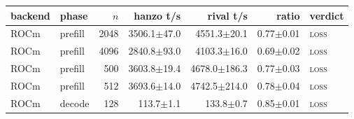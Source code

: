 \begin{tabular}{@{}llrrrrl@{}}
\toprule
backend & phase & $n$ & hanzo t/s & rival t/s & ratio & verdict \\
\midrule
ROCm & prefill & 2048 & 3506.1$\pm$47.0 & 4551.3$\pm$20.1 & 0.77$\pm$0.01 & \textsc{loss} \\
ROCm & prefill & 4096 & 2840.8$\pm$93.0 & 4103.3$\pm$16.0 & 0.69$\pm$0.02 & \textsc{loss} \\
ROCm & prefill & 500 & 3603.8$\pm$19.4 & 4678.0$\pm$186.3 & 0.77$\pm$0.03 & \textsc{loss} \\
ROCm & prefill & 512 & 3693.6$\pm$14.0 & 4742.5$\pm$214.0 & 0.78$\pm$0.04 & \textsc{loss} \\
ROCm & decode & 128 & 113.7$\pm$1.1 & 133.8$\pm$0.7 & 0.85$\pm$0.01 & \textsc{loss} \\
\bottomrule
\end{tabular}
